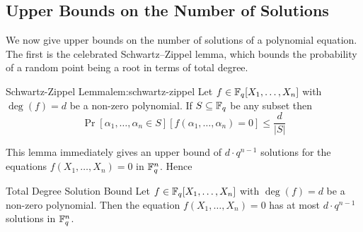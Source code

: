 \subsection{Upper Bounds on the Number of Solutions}

We now give upper bounds on the number of solutions of a polynomial equation. The first is the celebrated Schwartz--Zippel lemma, which bounds the probability of a random point being a root in terms of total degree.
\begin{lemma}{Schwartz-Zippel Lemma}{lem:schwartz-zippel}
  Let $f\in\mathbb{F}_q[X_1,\dots, X_n]$ with $\deg(f)=d$ be a non-zero polynomial. If $S\subseteq \mathbb{F}_q$ be any subset then $$\Pr[\alpha_1,\dots,\alpha_n\in S] [f(\alpha_1,\dots,\alpha_n)=0]\leq \frac{d}{|S|}$$
\end{lemma}
This lemma immediately gives an upper bound of $d\cdot q^{n-1}$ solutions for the equations $f(X_1,\dots, X_n)=0$ in $\mathbb{F}_q^n$. Hence 
\begin{corolary}{Total Degree Solution Bound}{}
  Let $f\in\mathbb{F}_q[X_1,\dots, X_n]$ with $\deg(f)=d$ be a non-zero polynomial. Then the equation $f(X_1,\dots, X_n)=0$ has at most $d\cdot q^{n-1}$ solutions in $\mathbb{F}_q^n$. 
\end{corolary}

